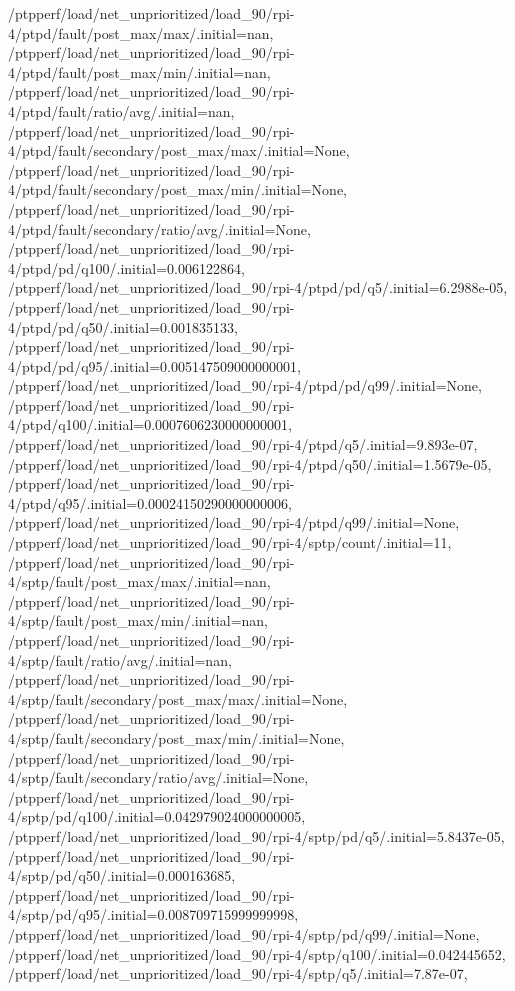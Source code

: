 {    /ptpperf/load/net_unprioritized/load_90/rpi-4/ptpd/fault/post_max/max/.initial=nan,
    /ptpperf/load/net_unprioritized/load_90/rpi-4/ptpd/fault/post_max/min/.initial=nan,
    /ptpperf/load/net_unprioritized/load_90/rpi-4/ptpd/fault/ratio/avg/.initial=nan,
    /ptpperf/load/net_unprioritized/load_90/rpi-4/ptpd/fault/secondary/post_max/max/.initial=None,
    /ptpperf/load/net_unprioritized/load_90/rpi-4/ptpd/fault/secondary/post_max/min/.initial=None,
    /ptpperf/load/net_unprioritized/load_90/rpi-4/ptpd/fault/secondary/ratio/avg/.initial=None,
    /ptpperf/load/net_unprioritized/load_90/rpi-4/ptpd/pd/q100/.initial=0.006122864,
    /ptpperf/load/net_unprioritized/load_90/rpi-4/ptpd/pd/q5/.initial=6.2988e-05,
    /ptpperf/load/net_unprioritized/load_90/rpi-4/ptpd/pd/q50/.initial=0.001835133,
    /ptpperf/load/net_unprioritized/load_90/rpi-4/ptpd/pd/q95/.initial=0.005147509000000001,
    /ptpperf/load/net_unprioritized/load_90/rpi-4/ptpd/pd/q99/.initial=None,
    /ptpperf/load/net_unprioritized/load_90/rpi-4/ptpd/q100/.initial=0.0007606230000000001,
    /ptpperf/load/net_unprioritized/load_90/rpi-4/ptpd/q5/.initial=9.893e-07,
    /ptpperf/load/net_unprioritized/load_90/rpi-4/ptpd/q50/.initial=1.5679e-05,
    /ptpperf/load/net_unprioritized/load_90/rpi-4/ptpd/q95/.initial=0.00024150290000000006,
    /ptpperf/load/net_unprioritized/load_90/rpi-4/ptpd/q99/.initial=None,
    /ptpperf/load/net_unprioritized/load_90/rpi-4/sptp/count/.initial=11,
    /ptpperf/load/net_unprioritized/load_90/rpi-4/sptp/fault/post_max/max/.initial=nan,
    /ptpperf/load/net_unprioritized/load_90/rpi-4/sptp/fault/post_max/min/.initial=nan,
    /ptpperf/load/net_unprioritized/load_90/rpi-4/sptp/fault/ratio/avg/.initial=nan,
    /ptpperf/load/net_unprioritized/load_90/rpi-4/sptp/fault/secondary/post_max/max/.initial=None,
    /ptpperf/load/net_unprioritized/load_90/rpi-4/sptp/fault/secondary/post_max/min/.initial=None,
    /ptpperf/load/net_unprioritized/load_90/rpi-4/sptp/fault/secondary/ratio/avg/.initial=None,
    /ptpperf/load/net_unprioritized/load_90/rpi-4/sptp/pd/q100/.initial=0.042979024000000005,
    /ptpperf/load/net_unprioritized/load_90/rpi-4/sptp/pd/q5/.initial=5.8437e-05,
    /ptpperf/load/net_unprioritized/load_90/rpi-4/sptp/pd/q50/.initial=0.000163685,
    /ptpperf/load/net_unprioritized/load_90/rpi-4/sptp/pd/q95/.initial=0.008709715999999998,
    /ptpperf/load/net_unprioritized/load_90/rpi-4/sptp/pd/q99/.initial=None,
    /ptpperf/load/net_unprioritized/load_90/rpi-4/sptp/q100/.initial=0.042445652,
    /ptpperf/load/net_unprioritized/load_90/rpi-4/sptp/q5/.initial=7.87e-07,
}
